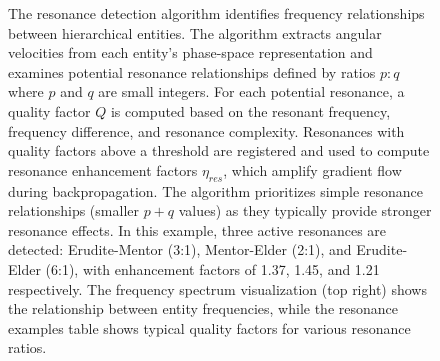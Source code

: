 \begin{figure}[t]
\caption{The resonance detection algorithm identifies frequency relationships between hierarchical entities. The algorithm extracts angular velocities from each entity's phase-space representation and examines potential resonance relationships defined by ratios $p:q$ where $p$ and $q$ are small integers. For each potential resonance, a quality factor $Q$ is computed based on the resonant frequency, frequency difference, and resonance complexity. Resonances with quality factors above a threshold are registered and used to compute resonance enhancement factors $\eta_{res}$, which amplify gradient flow during backpropagation. The algorithm prioritizes simple resonance relationships (smaller $p+q$ values) as they typically provide stronger resonance effects. In this example, three active resonances are detected: Erudite-Mentor (3:1), Mentor-Elder (2:1), and Erudite-Elder (6:1), with enhancement factors of 1.37, 1.45, and 1.21 respectively. The frequency spectrum visualization (top right) shows the relationship between entity frequencies, while the resonance examples table shows typical quality factors for various resonance ratios.}
\label{fig:resonance_detection}
\end{figure}